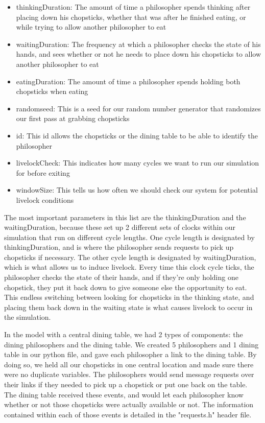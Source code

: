 \documentclass{article}
\begin{document}
\begin{itemize}
    \item thinkingDuration: The amount of time a philosopher spends thinking after placing down his chopsticks, whether that was after he finished eating, or while trying to allow another philosopher to eat
    \item waitingDuration: The frequency at which a philosopher checks the state of his hands, and sees whether or not he needs to place down his chopsticks to allow another philosopher to eat
    \item eatingDuration: The amount of time a philosopher spends holding both chopsticks when eating
    \item randomseed: This is a seed for our random number generator that randomizes our first pass at grabbing chopsticks
    \item id: This id allows the chopsticks or the dining table to be able to identify the philosopher
    \item livelockCheck: This indicates how many cycles we want to run our simulation for before exiting
    \item windowSize: This tells us how often we should check our system for potential livelock conditions
\end{itemize}

The most important parameters in this list are the thinkingDuration and the waitingDuration, because these set up 2 different sets of 
clocks within our simulation that run on different cycle lengths.  One cycle length is designated by thinkingDuration, and is where the 
philosopher sends requests to pick up chopsticks if necessary.  The other cycle length is designated by waitingDuration, which is what 
allows us to induce livelock.  Every time this clock cycle ticks, the philosopher checks the state of their hands, and if they’re only 
holding one chopstick, they put it back down to give someone else the opportunity to eat. This endless switching between looking for 
chopsticks in the thinking state, and placing them back down in the waiting state is what causes livelock to occur in the simulation.

In the model with a central dining table, we had 2 types of components: the dining philosophers and the dining table.  We created 5 
philosophers and 1 dining table in our python file, and gave each philosopher a link to the dining table.  By doing so, we held all 
our chopsticks in one central location and made sure there were no duplicate variables.  The philosophers would send message requests 
over their links if they needed to pick up a chopstick or put one back on the table.  The dining table received these events, and would 
let each philosopher know whether or not those chopsticks were actually available or not.  The information contained within each of those 
events is detailed in the "requests.h" header file.
\end{document}
